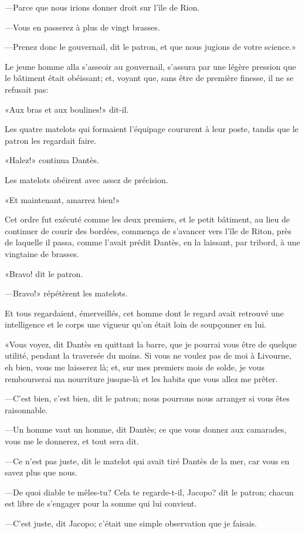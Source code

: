 —Parce que nous irions donner droit sur l'île de Rion.

—Vous en passerez à plus de vingt brasses.

—Prenez donc le gouvernail, dit le patron, et que nous jugions de votre science.»

Le jeune homme alla s'asseoir au gouvernail, s'assura par une légère pression que le bâtiment était obéissant; et, voyant que, sans être de première finesse, il ne se refusait pas:

«Aux bras et aux boulines!» dit-il.

Les quatre matelots qui formaient l'équipage coururent à leur poste, tandis que le patron les regardait faire.

«Halez!» continua Dantès.

Les matelots obéirent avec assez de précision.

«Et maintenant, amarrez bien!»

Cet ordre fut exécuté comme les deux premiers, et le petit bâtiment, au lieu de continuer de courir des bordées, commença de s'avancer vers l'île de Riton, près de laquelle il passa, comme l'avait prédit Dantès, en la laissant, par tribord, à une vingtaine de brasses.

«Bravo! dit le patron.

—Bravo!» répétèrent les matelots.

Et tous regardaient, émerveillés, cet homme dont le regard avait retrouvé une intelligence et le corps une vigueur qu'on était loin de soupçonner en lui.

«Vous voyez, dit Dantès en quittant la barre, que je pourrai vous être de quelque utilité, pendant la traversée du moins. Si vous ne voulez pas de moi à Livourne, eh bien, vous me laisserez là; et, sur mes premiers mois de solde, je vous rembourserai ma nourriture jusque-là et les habits que vous allez me prêter.

—C'est bien, c'est bien, dit le patron; nous pourrons nous arranger si vous êtes raisonnable.

—Un homme vaut un homme, dit Dantès; ce que vous donnez aux camarades, vous me le donnerez, et tout sera dit.

—Ce n'est pas juste, dit le matelot qui avait tiré Dantès de la mer, car vous en savez plus que nous.

—De quoi diable te mêles-tu? Cela te regarde-t-il, Jacopo? dit le patron; chacun est libre de s'engager pour la somme qui lui convient.

—C'est juste, dit Jacopo; c'était une simple observation que je faisais.

